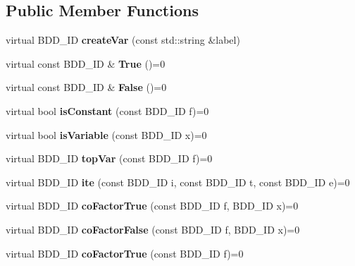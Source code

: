 \subsection*{Public Member Functions}
\begin{DoxyCompactItemize}
\item 
virtual B\+D\+D\+\_\+\+ID {\bfseries create\+Var} (const std\+::string \&label)\label{classClassProject_1_1Manager_a97ae19f8f11f5ed7ebe6caaa826f7e46}

\item 
virtual const B\+D\+D\+\_\+\+ID \& {\bfseries True} ()=0\label{classClassProject_1_1Manager_ab3eac0b08002740ba226316c95dbff7e}

\item 
virtual const B\+D\+D\+\_\+\+ID \& {\bfseries False} ()=0\label{classClassProject_1_1Manager_a92a90137d54f6d96bb04087710929238}

\item 
virtual bool {\bfseries is\+Constant} (const B\+D\+D\+\_\+\+ID f)=0\label{classClassProject_1_1Manager_add7cfa29b1325c264dc7c1be2ce8979f}

\item 
virtual bool {\bfseries is\+Variable} (const B\+D\+D\+\_\+\+ID x)=0\label{classClassProject_1_1Manager_a5f857f43e7d21d539428d46a83b768b9}

\item 
virtual B\+D\+D\+\_\+\+ID {\bfseries top\+Var} (const B\+D\+D\+\_\+\+ID f)=0\label{classClassProject_1_1Manager_a068688caab54859eab346ba70fc1651b}

\item 
virtual B\+D\+D\+\_\+\+ID {\bfseries ite} (const B\+D\+D\+\_\+\+ID i, const B\+D\+D\+\_\+\+ID t, const B\+D\+D\+\_\+\+ID e)=0\label{classClassProject_1_1Manager_a4694c8bc70fac1501005bfd767206246}

\item 
virtual B\+D\+D\+\_\+\+ID {\bfseries co\+Factor\+True} (const B\+D\+D\+\_\+\+ID f, B\+D\+D\+\_\+\+ID x)=0\label{classClassProject_1_1Manager_a0abf6b5a273bf49b2f7fb1c371a62b91}

\item 
virtual B\+D\+D\+\_\+\+ID {\bfseries co\+Factor\+False} (const B\+D\+D\+\_\+\+ID f, B\+D\+D\+\_\+\+ID x)=0\label{classClassProject_1_1Manager_a49aa66978b764a8929c48d29d0aa7d6f}

\item 
virtual B\+D\+D\+\_\+\+ID {\bfseries co\+Factor\+True} (const B\+D\+D\+\_\+\+ID f)=0\label{classClassProject_1_1Manager_ae515a5798d7211188a2529ee7c74e88f}


\end{DoxyCompactItemize}
